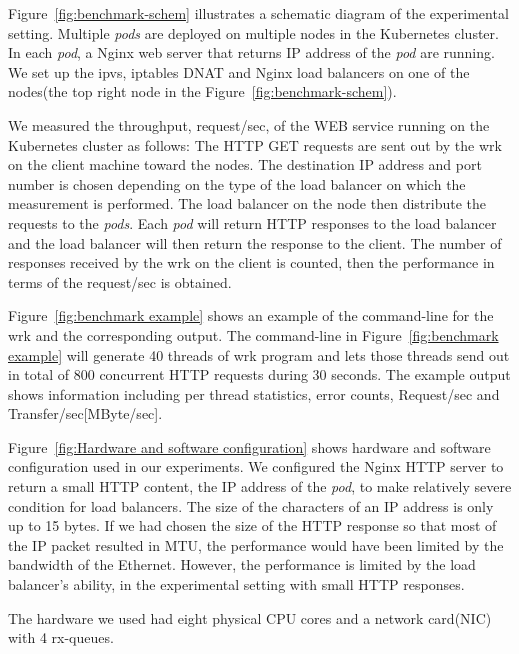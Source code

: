 Figure~\ref{fig:benchmark-schem} illustrates a schematic diagram of the experimental setting.
Multiple {\em pods} are deployed on multiple nodes in the Kubernetes cluster. 
In each {\em pod}, a Nginx web server that returns IP address of the {\em pod} are running.
We set up the ipvs, iptables DNAT and Nginx load balancers on one of the nodes(the top right node in the Figure~\ref{fig:benchmark-schem}). 

We measured the throughput, request/sec, of the WEB service running on the Kubernetes cluster as follows:
The HTTP GET requests are sent out by the wrk on the client machine toward the nodes.
The destination IP address and port number is chosen depending on the type of the load balancer on which the measurement is performed.
The load balancer on the node then distribute the requests to the {\em pods}.
Each {\em pod} will return HTTP responses to the load balancer and the load balancer will then 
return the response to the client.
The number of responses received by the wrk on the client is counted, 
then the performance in terms of the request/sec is obtained. 

Figure~\ref{fig:benchmark example} shows an example of the command-line for the wrk and the corresponding output.
The command-line in Figure~\ref{fig:benchmark example} will generate 40 threads of wrk program 
and lets those threads send out in total of 800 concurrent HTTP requests during 30 seconds.
The example output shows information including per thread statistics, error counts, Request/sec and Transfer/sec[MByte/sec].

Figure~\ref{fig:Hardware and software configuration} shows hardware and software configuration used in our experiments.
We configured the Nginx HTTP server to return a small HTTP content, 
the IP address of the {\em pod}, to make relatively severe condition for load balancers. 
The size of the characters of an IP address is only up to 15 bytes.
If we had chosen the size of the HTTP response so that most of the IP packet resulted in MTU, 
the performance would have been limited by the bandwidth of the Ethernet.
However, the performance is limited by the load balancer's ability, in the experimental setting with small HTTP responses.

The hardware we used had eight physical CPU cores and a network card(NIC) with 4 rx-queues.

